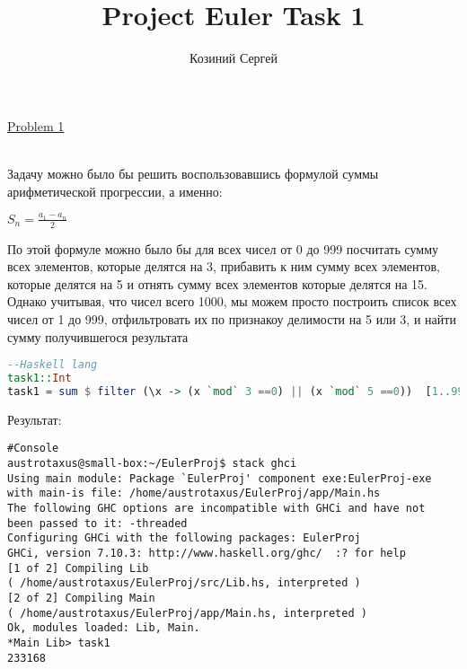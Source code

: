 \documentclass[11pt,a4paper]{article}
\title{Project Euler Task 1}
\author{Козиний Сергей}
\begin{document}
    
\maketitle
\href{''https://projecteuler.net/problem=1''}{Problem 1}

\\

Задачу можно было бы решить воспользовавшись формулой суммы арифметической прогрессии, а именно:

$S_n = \frac {a_1 -  a_n} 2$

По этой формуле можно было бы для всех чисел от 0 до 999 посчитать сумму всех элементов, которые делятся на 3, прибавить к ним сумму всех элементов, которые делятся на 5 и отнять сумму всех элементов которые делятся на 15. Однако учитывая, что чисел всего 1000, мы можем просто построить список всех чисел от 1 до 999, отфильтровать их по признакоу делимости на 5 или 3, и найти сумму получившегося результата

\begin{lstlisting}[language=Haskell, frame=single]
--Haskell lang
task1::Int
task1 = sum $ filter (\x -> (x `mod` 3 ==0) || (x `mod` 5 ==0))  [1..999]
\end{lstlisting}

Результат:

\begin{lstlisting}[frame=single]
#Console
austrotaxus@small-box:~/EulerProj$ stack ghci
Using main module: Package `EulerProj' component exe:EulerProj-exe
with main-is file: /home/austrotaxus/EulerProj/app/Main.hs
The following GHC options are incompatible with GHCi and have not
been passed to it: -threaded
Configuring GHCi with the following packages: EulerProj
GHCi, version 7.10.3: http://www.haskell.org/ghc/  :? for help
[1 of 2] Compiling Lib
( /home/austrotaxus/EulerProj/src/Lib.hs, interpreted )
[2 of 2] Compiling Main
( /home/austrotaxus/EulerProj/app/Main.hs, interpreted )
Ok, modules loaded: Lib, Main. 
*Main Lib> task1
233168
\end{lstlisting}
\end{document}
